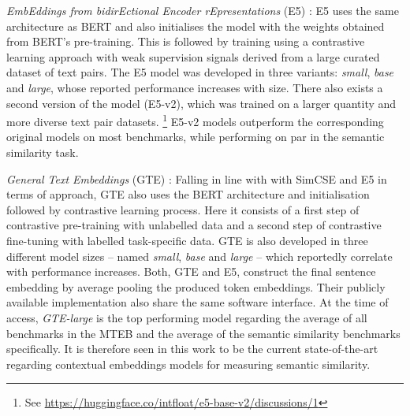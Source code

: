 \documentclass[11pt]{scrreprt}
\let\cite\parencite  %
\begin{document}
\textit{EmbEddings from bidirEctional Encoder rEpresentations} (E5) \cite{wangTextEmbeddingsWeaklySupervised2022}:
E5 uses the same architecture as BERT and also initialises the model with the weights obtained from BERT's pre-training. This is followed by training using a contrastive learning approach with weak supervision signals derived from a large curated dataset of text pairs. The E5 model was developed in three variants: \textit{small}, \textit{base} and \textit{large}, whose reported performance increases with size. There also exists a second version of the model (E5-v2), which was trained on a larger quantity and more diverse text pair datasets. \footnote{See \url{https://huggingface.co/intfloat/e5-base-v2/discussions/1}} E5-v2 models outperform the corresponding original models on most benchmarks, while performing on par in the semantic similarity task.

\textit{General Text Embeddings} (GTE) \cite{liGeneralTextEmbeddings2023}: Falling in line with with SimCSE and E5 in terms of approach, GTE also uses the BERT architecture and initialisation followed by contrastive learning process. Here it consists of a first step of contrastive pre-training with unlabelled data and a second step of contrastive fine-tuning with labelled task-specific data. GTE is also developed in three different model sizes -- named \textit{small}, \textit{base} and \textit{large} -- which reportedly correlate with performance increases. Both, GTE and E5, construct the final sentence embedding by average pooling the produced token embeddings. Their publicly available implementation also share the same software interface. At the time of access, \textit{GTE-large} is the top performing model regarding the average of all benchmarks in the MTEB and the average of the semantic similarity benchmarks specifically. It is therefore seen in this work to be the current state-of-the-art regarding contextual embeddings models for measuring semantic similarity.

%

\end{document}
